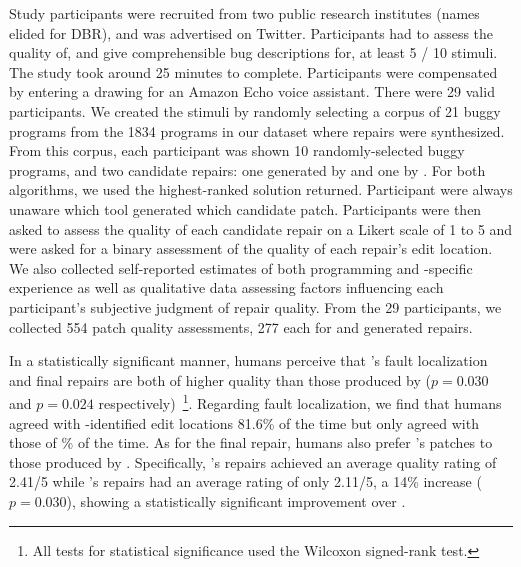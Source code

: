 %
Study participants were recruited from two public research
institutes (names elided for DBR), and was advertised on Twitter.
%
Participants had to assess the quality of, and give comprehensible
bug descriptions for, at least 5 / 10 stimuli. The study took around
25 minutes to complete. Participants were compensated by entering a
drawing for an Amazon Echo voice assistant. There were 29 valid participants.
%
We created the stimuli by randomly selecting a corpus of 21 buggy programs
from the 1834 programs in our dataset where repairs were synthesized.
%
From this corpus, each participant was shown 10 randomly-selected buggy
programs, and two candidate repairs: one generated by \toolname and one
by \seminal.
%
For both algorithms, we used the highest-ranked solution returned.
%
Participant were always unaware which tool generated which candidate
patch.
%
Participants were then asked to assess the quality of each
candidate repair on a Likert scale of 1 to 5 and were asked
for a binary assessment of the quality of each repair's edit
location.
%
We also collected self-reported estimates of both programming and
\ocaml-specific experience as well as qualitative data assessing factors
influencing each participant's subjective judgment of repair quality.
%
From the 29 participants, we collected 554 patch quality assessments,
277 each for \toolname and \seminal generated repairs.


%
In a statistically significant manner, humans perceive that
\toolname's fault localization and final repairs are both
of higher quality than those produced by \seminal ($p=0.030$
and $p=0.024$ respectively)~\footnote{All tests for statistical
significance used the Wilcoxon signed-rank test.}.
%
Regarding fault localization, we find that humans agreed
with \toolname-identified edit locations 81.6\% of the time
but only agreed with those of \% of the time.
%
%
As for the final repair, humans also prefer \toolname's patches
to those produced by \seminal. Specifically, \toolname's repairs
achieved an average quality rating of 2.41/5 while \seminal's
repairs had an average rating of only 2.11/5, a 14\% increase ($p=0.030$),
showing a statistically significant improvement over \seminal.

